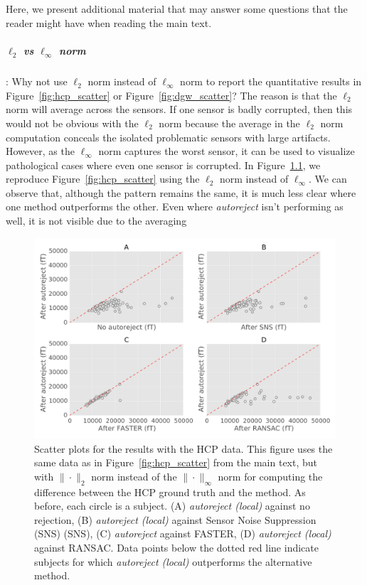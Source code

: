 \begin{appendices}
\chapter{}

Here, we present additional material that may answer some questions that the reader might have when reading the main text.

\paragraph{$\ell_{2}$ vs $\ell_{\infty}$ norm}: Why not use $\ell_{2}$ norm instead of $\ell_{\infty}$ norm to report the quantitative results in Figure~\ref{fig:hcp_scatter} or Figure~\ref{fig:dgw_scatter}? The reason is that the $\ell_{2}$ norm will average across the sensors. If one sensor is badly corrupted, then this would not be obvious with the $\ell_{2}$ norm because the average in the $\ell_{2}$ norm computation conceals the isolated problematic sensors with large artifacts. However, as the $\ell_\infty$ norm captures the worst sensor, it can be used to visualize pathological cases where even one sensor is corrupted. In Figure~\ref{fig:l2_norm}, we reproduce Figure~\ref{fig:hcp_scatter} using the $\ell_2$ norm instead of $\ell_{\infty}$. We can observe that, although the pattern remains the same, it is much less clear where one method outperforms the other. Even where \emph{autoreject} isn't performing as well, it is not  visible due to the averaging %

\begin{figure}[htb]
	\centering
	\includegraphics[width=0.9\linewidth]{figures/figure4_supp.pdf}
    \caption{Scatter plots for the results with the HCP data. This figure uses the same data as in Figure~\ref{fig:hcp_scatter} from the main text, but with  $\|\cdot\|_2$ norm instead of the $\|\cdot\|_\infty$ norm for computing the difference between the HCP ground truth and the method. As before, each circle is a subject. (A) \textit{autoreject (local)} against no rejection, (B) \textit{autoreject (local)} against Sensor Noise Suppression (SNS) (SNS), (C) \textit{autoreject} against FASTER, (D) \textit{autoreject (local)} against RANSAC. Data points below the dotted red line indicate subjects for which \textit{autoreject (local)} outperforms the alternative method.}
    \label{fig:l2_norm}
\end{figure}


\end{appendices}
